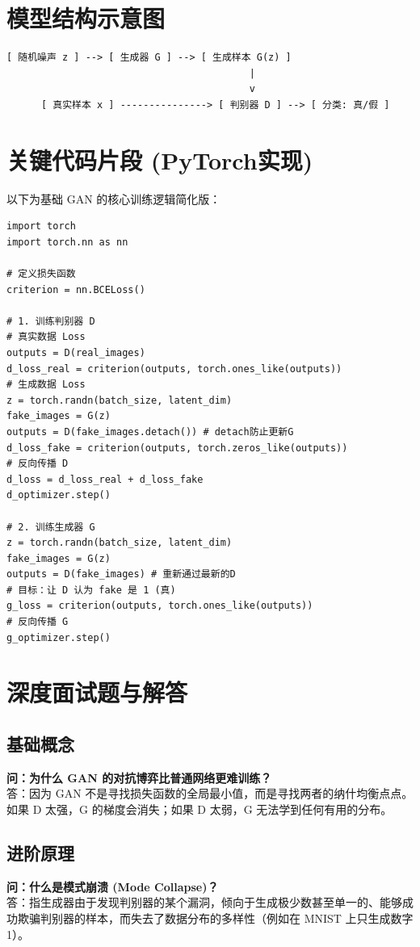 \documentclass[12pt, a4paper]{book}
\begin{document}
\section{模型结构示意图}
\begin{verbatim}
[ 随机噪声 z ] --> [ 生成器 G ] --> [ 生成样本 G(z) ] 
                                          |
                                          v
      [ 真实样本 x ] ---------------> [ 判别器 D ] --> [ 分类: 真/假 ]
\end{verbatim}

\section{关键代码片段 (PyTorch实现)}
以下为基础 GAN 的核心训练逻辑简化版：
\begin{lstlisting}
import torch
import torch.nn as nn

# 定义损失函数
criterion = nn.BCELoss()

# 1. 训练判别器 D
# 真实数据 Loss
outputs = D(real_images)
d_loss_real = criterion(outputs, torch.ones_like(outputs))
# 生成数据 Loss
z = torch.randn(batch_size, latent_dim)
fake_images = G(z)
outputs = D(fake_images.detach()) # detach防止更新G
d_loss_fake = criterion(outputs, torch.zeros_like(outputs))
# 反向传播 D
d_loss = d_loss_real + d_loss_fake
d_optimizer.step()

# 2. 训练生成器 G
z = torch.randn(batch_size, latent_dim)
fake_images = G(z)
outputs = D(fake_images) # 重新通过最新的D
# 目标：让 D 认为 fake 是 1 (真)
g_loss = criterion(outputs, torch.ones_like(outputs))
# 反向传播 G
g_optimizer.step()
\end{lstlisting}

\section{深度面试题与解答}
\subsection{基础概念}
\textbf{问：为什么 GAN 的对抗博弈比普通网络更难训练？}\\
答：因为 GAN 不是寻找损失函数的全局最小值，而是寻找两者的纳什均衡点点。如果 D 太强，G 的梯度会消失；如果 D 太弱，G 无法学到任何有用的分布。

\subsection{进阶原理}
\textbf{问：什么是模式崩溃 (Mode Collapse)？}\\
答：指生成器由于发现判别器的某个漏洞，倾向于生成极少数甚至单一的、能够成功欺骗判别器的样本，而失去了数据分布的多样性（例如在 MNIST 上只生成数字 1）。
\end{document}
